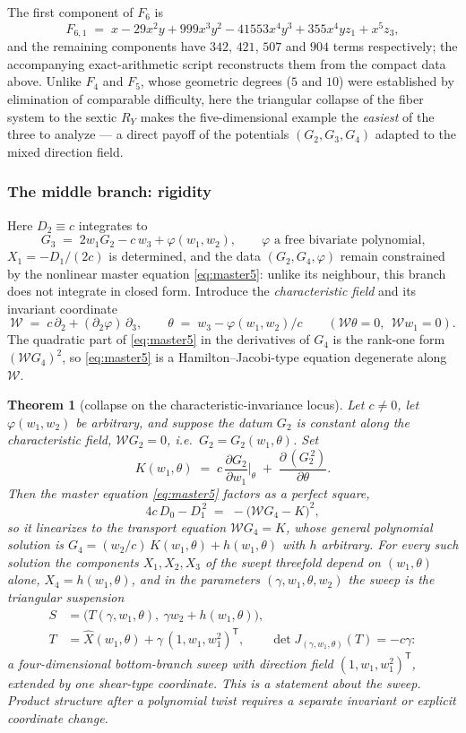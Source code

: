 \documentclass[11pt]{article}
\numberwithin{equation}{section}
\theoremstyle{plain}
\newtheorem{theorem}{Theorem}[section]
\theoremstyle{definition}
\theoremstyle{remark}
\begin{document}
The first component of $F_6$ is
\[
F_{6,1}\;=\;x-29x^2y+999x^3y^2-41553x^4y^3+355x^4yz_1+x^5z_3 ,
\]
and the remaining components have $342$, $421$, $507$ and $904$ terms
respectively; the accompanying exact-arithmetic script reconstructs them from the
compact data above. Unlike $F_4$ and $F_5$, whose geometric degrees ($5$ and
$10$) were established by elimination of comparable difficulty, here the
triangular collapse of the fiber system to the sextic $R_Y$ makes the
five-dimensional example the \emph{easiest} of the three to analyze --- a
direct payoff of the potentials $(G_2,G_3,G_4)$ adapted to the mixed direction
field.

\subsubsection{The middle branch: rigidity}\label{subsubsec:middle5}

Here $D_2\equiv c$ integrates to
\[
G_3\;=\;2w_1G_2-c\,w_3+\varphi(w_1,w_2),
\qquad\text{$\varphi$ a free bivariate polynomial,}
\]
$X_1=-D_1/(2c)$ is determined, and the data $(G_2,G_4,\varphi)$ remain
constrained by the nonlinear master equation \eqref{eq:master5}: unlike its
neighbour, this branch does not integrate in closed form. Introduce the
\emph{characteristic field} and its invariant coordinate
\[
\mathcal W\;=\;c\,\partial_2+(\partial_2\varphi)\,\partial_3 ,
\qquad
\theta\;=\;w_3-\varphi(w_1,w_2)/c
\qquad(\mathcal W\theta=0,\ \ \mathcal W w_1=0).
\]
The quadratic part of \eqref{eq:master5} in the derivatives of $G_4$ is the
rank-one form $(\mathcal W G_4)^2$, so \eqref{eq:master5} is a
Hamilton--Jacobi-type equation degenerate along $\mathcal W$.

\begin{theorem}[collapse on the characteristic-invariance locus]\label{thm:collapse5}
Let $c\neq0$, let $\varphi(w_1,w_2)$ be arbitrary, and suppose the datum $G_2$ is
constant along the characteristic field, $\mathcal WG_2=0$, i.e.\
$G_2=G_2(w_1,\theta)$. Set
\[
K(w_1,\theta)\;=\;c\,\frac{\partial G_2}{\partial w_1}\Big|_{\theta}
\;+\;\frac{\partial\,(G_2^{\,2})}{\partial\theta}.
\]
Then the master equation \eqref{eq:master5} factors as a perfect square,
\[
4c\,D_0-D_1^{\,2}\;=\;-\bigl(\mathcal WG_4-K\bigr)^2 ,
\]
so it linearizes to the transport equation $\mathcal WG_4=K$, whose general
polynomial solution is $G_4=(w_2/c)\,K(w_1,\theta)+h(w_1,\theta)$ with $h$
arbitrary. For every such solution the components $X_1,X_2,X_3$ of the swept
threefold depend on $(w_1,\theta)$ alone, $X_4=h(w_1,\theta)$, and in the
parameters $(\gamma,w_1,\theta,w_2)$ the sweep is the triangular suspension
\[
\begin{aligned}
S&=\bigl(T(\gamma,w_1,\theta),\ \gamma w_2+h(w_1,\theta)\bigr),\\
T&=\widehat X(w_1,\theta)+\gamma\,(1,w_1,w_1^2)^{\mathsf T},\qquad
\det J_{(\gamma,w_1,\theta)}(T)=-c\gamma:
\end{aligned}
\]
a four-dimensional bottom-branch sweep with direction field $(1,w_1,w_1^2)^{\mathsf T}$,
extended by one shear-type coordinate. This is a statement about the sweep. Product structure after a
polynomial twist requires a separate invariant or explicit coordinate change.
\end{theorem}
\end{document}
